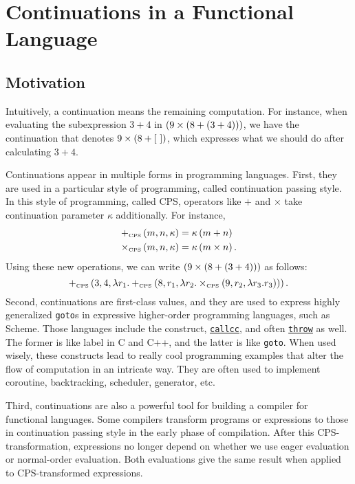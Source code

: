 \chapter{Continuations in a Functional Language}

\section{Motivation}

\begin{enumcirc}
	\item
	Intuitively, a continuation means the remaining computation.
	For instance, when evaluating the subexpression $3 + 4$ in
	$\left( 9 \times \left( 8 + \left( 3 + 4 \right) \right) \right)$,
	we have the continuation that denotes $9 \times \left( 8 + \left[ \,  \, \right] \right)$, which
	expresses what we should do after calculating $3 + 4$.
	\item
	Continuations appear in multiple forms in programming languages.
	First, they are used in a particular style of programming, called continuation
	passing style.
	In this style of programming, called CPS, operators like $+$ and $\times$ take
	continuation parameter $\kappa$ additionally.
	For instance,
	\begin{align*}
		+_{\textrm{\tiny CPS}} \left( m, n, \kappa \right)      & = \kappa \left( m + n \right)       \\
		\times_{\textrm{\tiny CPS}} \left( m, n, \kappa \right) & = \kappa \left( m \times n \right).
	\end{align*}
	Using these new operations, we can write
	$\left( 9 \times \left( 8 + \left( 3 + 4 \right) \right) \right)$
	as follows:
	\[
		+_{\textrm{\tiny CPS}} \left( 
			3,
			4,
			\lambda r_1. +_{\textrm{\tiny CPS}} \left( 
				8,
				r_1,
				\lambda r_2. \times_{\textrm{\tiny CPS}} \left( 
					9,
					r_2,
					\lambda r_3. r_3
				 \right)
			 \right)
		 \right).
	\]
	Second, continuations are first-class values, and they are used to express
	highly generalized \texttt{goto}s in expressive higher-order programming
	languages, such as Scheme.
	Those languages include the construct, \ul{\texttt{callcc}}, and often
	\ul{\texttt{throw}} as well.
	The former is like label in C and C++, and the latter is like \texttt{goto}.
	When used wisely, these constructs lead to really cool programming examples
	that alter the flow of computation in an intricate way.
	They are often used to implement coroutine, backtracking, scheduler, generator,
	etc.

	Third, continuations are also a powerful tool for building a compiler for
	functional languages.
	Some compilers transform programs or expressions to those in continuation
	passing style in the early phase of compilation.
	After this CPS-transformation, expressions no longer depend on whether we use
	eager evaluation or normal-order evaluation.
	Both evaluations give the same result when applied to CPS-transformed
	expressions.


\end{enumcirc}
